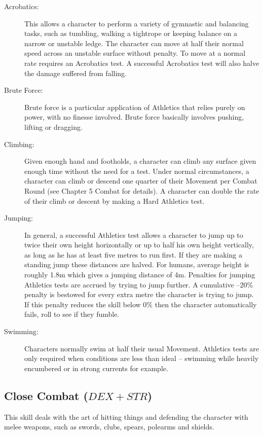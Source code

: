 \begin{description}
	\item[Acrobatics:] This allows a character to perform a variety of gymnastic and balancing tasks, such as tumbling, walking a tightrope or keeping balance on a narrow or unstable ledge. The character can move at half their normal speed across an unstable surface without penalty. To move at a normal rate requires an Acrobatics test. A successful Acrobatics test will also halve the damage suffered from falling. 

	\item[Brute Force:] Brute force is a particular application of Athletics that relies purely on power, with no finesse involved. Brute force basically involves pushing, lifting or dragging. 

	\item[Climbing:] Given enough hand and footholds, a character can climb any surface given enough time without the need for a test. Under normal circumstances, a character can climb or descend one quarter of their Movement per Combat Round (see Chapter 5 Combat for details). A character can double the rate of their climb or descent by making a Hard Athletics test. 

	\item[Jumping:] In general, a successful Athletics test allows a character to jump up to twice their own height horizontally or up to half his own height vertically, as long as he has at least five metres to run first. If they are making a standing jump these distances are halved. For humans, average height is roughly 1.8m which gives a jumping distance of 4m. Penalties for jumping Athletics tests are accrued by trying to jump further. A cumulative –20\% penalty is bestowed for every extra metre the character is trying to jump. If this penalty reduces the skill below 0\% then the character automatically fails, roll to see if they fumble.

	\item[Swimming:] Characters normally swim at half their usual Movement. Athletics tests are only required when conditions are less than ideal – swimming while heavily encumbered or in strong currents for example. 
\end{description}

\subsection{Close Combat ($DEX+STR$)}
This skill deals with the art of hitting things and defending the character with melee weapons, such as swords, clubs, spears, polearms and shields.

